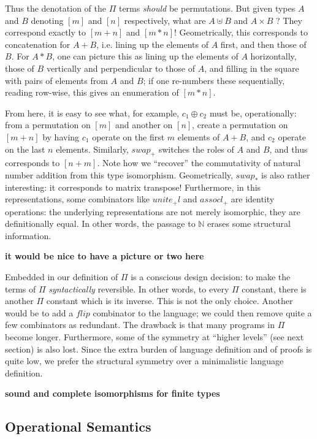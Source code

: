 \documentclass{article}
\newcommand{\identlp}{\mathit{unite}_+\mathit{l}}
\newcommand{\swapp}{\mathit{swap}_+}
\newcommand{\assoclp}{\mathit{assocl}_+}
\newcommand{\swapt}{\mathit{swap}_*}
\newcommand{\amr}[1]{\fbox{Amr says:} \textbf{#1}}
\newcommand{\jc}[1]{\fbox{Jacques says:} \textbf{#1}}
\newcommand{\fin}[1]{\ensuremath{\left[#1\right]}}
\newcommand{\Nat}{\ensuremath{\mathbb{N}}}
\begin{document}
Thus the denotation of the $\Pi$ terms \emph{should} be permutations. But
given types $A$ and $B$ denoting $\fin{m}$ and $\fin{n}$ respectively,
what are $A \uplus B$ and $A \times B$ ?  They correspond exactly to
$\fin{m+n}$ and $\fin{m*n}$!  Geometrically, this corresponds to
concatenation for $A + B$, i.e. lining up the elements of $A$ first,
and then those of $B$. For $A * B$, one can picture this as
lining up the elements of $A$ horizontally, those of $B$ vertically
and perpendicular to those of $A$, and filling in the square with
pairs of elements from $A$ and $B$; if one re-numbers these sequentially,
reading row-wise, this gives an enumeration of $\fin{m*n}$.

From here, it is easy to see what, for example, $c_1 \oplus c_2$ must be,
operationally: from a permutation on $\fin{m}$ and another on $\fin{n}$,
create a permutation on $\fin{m+n}$ by having $c_1$ operate on the first
$m$ elements of $A+B$, and $c_2$ operate on the last $n$ elements. 
Similarly, $\swapp$ switches the roles of $A$ and $B$, and thus corresponds
to $\fin{n+m}$. Note how we ``recover'' the commutativity of 
natural number addition from this type isomorphism. Geometrically, $\swapt$
is also rather interesting: it corresponds to matrix transpose!
Furthermore, in this representations, some combinators like
$\identlp$ and $\assoclp$ are identity operations: the underlying representations
are not merely isomorphic, they are definitionally equal.
In other words, the passage to $\Nat$ erases some structural information.

\jc{it would be nice to have a picture or two here}

Embedded in our definition of $\Pi$ is a conscious design decision: to make the
terms of $\Pi$ \emph{syntactically} reversible. In other words, to
every $\Pi$ constant, there is another $\Pi$ constant which is its
inverse. This is not the only choice.  Another would be to add a
$\mathit{flip}$ combinator to the language; we could then remove
quite a few combinators as redundant. The drawback is that many
programs in $\Pi$ become longer. Furthermore, some of the symmetry
at ``higher levels'' (see next section) is also lost. Since the
extra burden of language definition and of proofs is quite low, we
prefer the structural symmetry over a minimalistic language definition.

\amr{sound and complete isomorphisms for finite types}

\subsection{Operational Semantics} 
\end{document}

